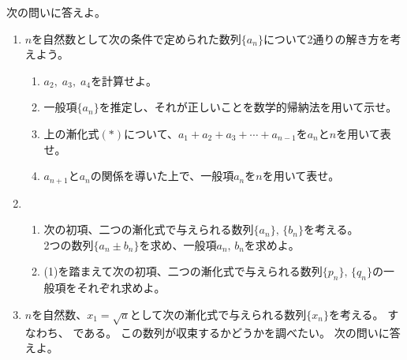 \documentclass[a4paper]{ltjsarticle}
\begin{document}
\begin{question*}
次の問いに答えよ。
\begin{enumerate}[label=\arabic*.]
  \item %
  $n$を自然数として次の条件で定められた数列$\{a_n\}$について2通りの解き方を考えよう。\\ %


  \begin{enumerate}[label=(\arabic*)]
    \item $a_2,\;a_3,\;a_4$を計算せよ。\\
    \item 一般項$\{a_n\}$を推定し、それが正しいことを数学的帰納法を用いて示せ。\\
    \item 上の漸化式$(*)$について、$a_1 + a_2 + a_3 + \cdots + a_{n-1}$を$a_n$と$n$を用いて表せ。\\
    \item $a_{n+1}$と$a_n$の関係を導いた上で、一般項$a_n$を$n$を用いて表せ。\\
  \end{enumerate}

\baselineskip

  \item %
  \begin{enumerate}[label=(\arabic*)]
    \item 次の初項、二つの漸化式で与えられる数列$\{a_n\},\, \{b_n\}$を考える。\\
    2つの数列$\{a_n\pm b_n\}$を求め、一般項$a_n,\, b_n$を求めよ。\\

    \item (1)を踏まえて次の初項、二つの漸化式で与えられる数列$\{p_n\},\, \{q_n\}$の一般項をそれぞれ求めよ。%

    \end{enumerate}
\baselineskip
  \item %
  $n$を自然数、$x_1 = \sqrt{a}$として次の漸化式で与えられる数列$\{x_n\}$を考える。
  すなわち、
  である。
  この数列が収束するかどうかを調べたい。
  次の問いに答えよ。


\end{enumerate}
\end{question*}
\end{document}
